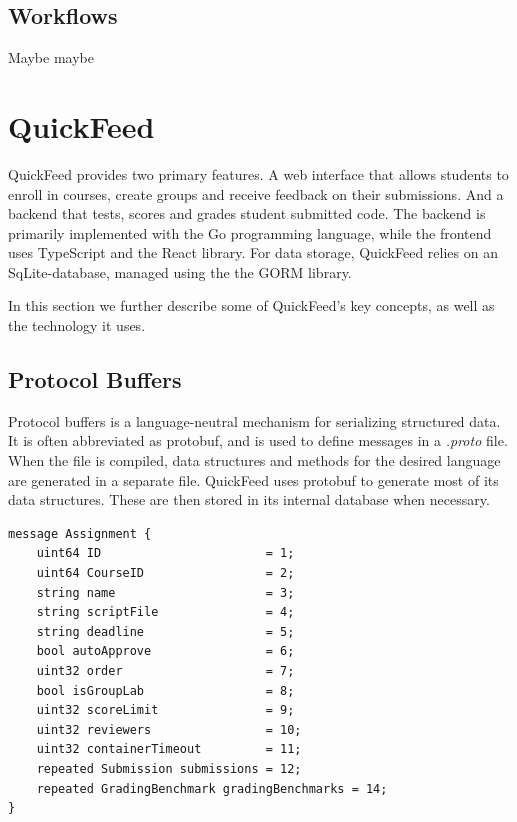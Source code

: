 \subsection{Workflows}

Maybe maybe

\section{QuickFeed}

QuickFeed provides two primary features.
A web interface that allows students to enroll in courses, create groups and receive feedback on their submissions.
And a backend that tests, scores and grades student submitted code.
The backend is primarily implemented with the Go programming language, while the frontend uses TypeScript and the React library.
For data storage, QuickFeed relies on an SqLite-database, managed using the the GORM library.

In this section we further describe some of QuickFeed's key concepts, as well as the technology it uses.

\subsection{Protocol Buffers}

Protocol buffers is a language-neutral mechanism for serializing structured data. %
It is often abbreviated as protobuf, and is used to define messages in a \textit{.proto} file.
When the file is compiled, data structures and methods for the desired language are generated in a separate file.
QuickFeed uses protobuf to generate most of its data structures.
These are then stored in its internal database when necessary.

\begin{lstlisting}[caption={Assignment message}, label={code:Assignment}]
message Assignment {
    uint64 ID                       = 1;
    uint64 CourseID                 = 2;
    string name                     = 3;
    string scriptFile               = 4;
    string deadline                 = 5;
    bool autoApprove                = 6;
    uint32 order                    = 7;
    bool isGroupLab                 = 8;
    uint32 scoreLimit               = 9;
    uint32 reviewers                = 10;
    uint32 containerTimeout         = 11;
    repeated Submission submissions = 12;
    repeated GradingBenchmark gradingBenchmarks = 14;
}
\end{lstlisting}

